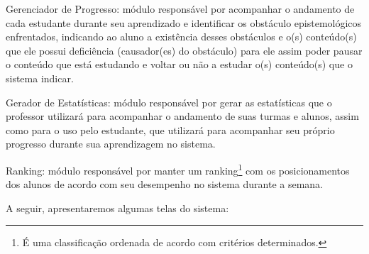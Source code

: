 \begin{alineascomponto}
	\item Gerenciador de Progresso: módulo responsável por acompanhar o andamento de cada estudante durante seu aprendizado e identificar os obstáculo epistemológicos enfrentados, indicando ao aluno 
a exist\^encia desses obst\'aculos e o(s) conte\'udo(s) que ele possui defici\^encia (causador(es) do obstáculo) para ele assim poder pausar o conte\'udo que est\'a estudando e voltar ou n\~ao a 
estudar o(s) conte\'udo(s) que o sistema indicar.

	\item Gerador de Estatísticas: módulo responsável por gerar as estatísticas que o professor utilizará para acompanhar o andamento de suas turmas e alunos, assim como para o uso pelo estudante, 
que utilizará para acompanhar seu próprio progresso durante sua aprendizagem no sistema.
    
    \item Ranking: módulo responsável por manter um ranking\footnote{É uma classificação ordenada de acordo com critérios determinados.} com os posicionamentos dos alunos de acordo com seu desempenho 
no sistema durante a semana.
    
\end{alineascomponto}

A seguir, apresentaremos algumas telas do sistema:

